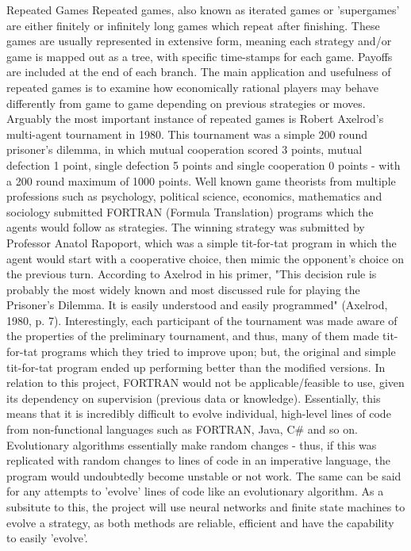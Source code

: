 \documentclass[12pt,a4paper]{article}
\makeatletter
\renewcommand\subsection{\@startsection {subsection}{1}{2mm}
                               {3pt plus 2pt minus 1pt}
                               {3pt plus 0pt}
                               {\normalfont\bfseries}}
\makeatother
\begin{document}
\subsection{Repeated Games}
Repeated games, also known as iterated games or 'supergames' are either finitely or infinitely long games which repeat after finishing. These games are usually represented in extensive form, meaning each strategy and/or game is mapped out as a tree, with specific time-stamps for each game. Payoffs are included at the end of each branch. The main application and usefulness of repeated games is to examine how economically rational players may behave differently from game to game depending on previous strategies or moves. Arguably the most important instance of repeated games is Robert Axelrod's multi-agent tournament in 1980. This tournament was a simple 200 round prisoner's dilemma, in which mutual cooperation scored 3 points, mutual defection 1 point, single defection 5 points and single cooperation 0 points - with a 200 round maximum of 1000 points. Well known game theorists from multiple professions such as psychology, political science, economics, mathematics and sociology submitted FORTRAN (Formula Translation) programs which the agents would follow as strategies. The winning strategy was submitted by Professor Anatol Rapoport, which was a simple tit-for-tat program in which the agent would start with a cooperative choice, then mimic the opponent's choice on the previous turn. According to Axelrod in his primer, "This decision rule is probably the most widely known and most discussed rule for playing the Prisoner's Dilemma. It is easily understood and easily programmed" (Axelrod, 1980, p. 7). Interestingly, each participant of the tournament was made aware of the properties of the preliminary tournament, and thus, many of them made tit-for-tat programs which they tried to improve upon; but, the original and simple tit-for-tat program ended up performing better than the modified versions. In relation to this project, FORTRAN would not be applicable/feasible to use, given its dependency on supervision (previous data or knowledge). Essentially, this means that it is incredibly difficult to evolve individual, high-level lines of code from non-functional languages such as FORTRAN, Java, C\# and so on. Evolutionary algorithms essentially make random changes - thus, if this was replicated with random changes to lines of code in an imperative language, the program would undoubtedly become unstable or not work. The same can be said for any attempts to 'evolve' lines of code like an evolutionary algorithm. As a subsitute to this, the project will use neural networks and finite state machines to evolve a strategy, as both methods are reliable, efficient and have the capability to easily 'evolve'. \\
\end{document}
